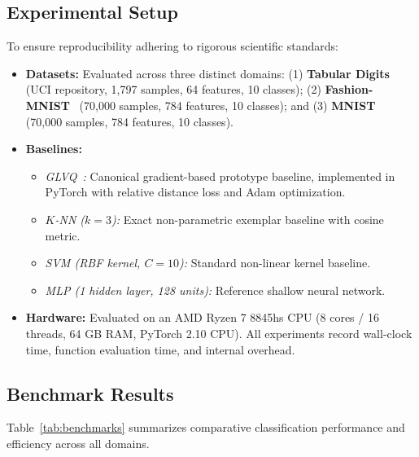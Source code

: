 \documentclass[11pt,a4paper]{article}
\begin{document}
\subsection{Experimental Setup}
To ensure reproducibility adhering to rigorous scientific standards:
\begin{itemize}
    \item \textbf{Datasets:} Evaluated across three distinct domains: (1) \textbf{Tabular Digits} (UCI repository, 1,797 samples, 64 features, 10 classes); (2) \textbf{Fashion-MNIST}~\citep{xiao2017fashion} (70,000 samples, 784 features, 10 classes); and (3) \textbf{MNIST}~\citep{lecun1998gradient} (70,000 samples, 784 features, 10 classes).
    \item \textbf{Baselines:} 
    \begin{itemize}
        \item \textit{GLVQ~\citep{sato1996generalized}:} Canonical gradient-based prototype baseline, implemented in PyTorch with relative distance loss and Adam optimization.
        \item \textit{$K$-NN ($k=3$):} Exact non-parametric exemplar baseline with cosine metric.
        \item \textit{SVM (RBF kernel, $C=10$):} Standard non-linear kernel baseline.
        \item \textit{MLP (1 hidden layer, 128 units):} Reference shallow neural network.
    \end{itemize}
    \item \textbf{Hardware:} Evaluated on an AMD Ryzen 7 8845hs CPU (8 cores / 16 threads, 64 GB RAM, PyTorch 2.10 CPU). All experiments record wall-clock time, function evaluation time, and internal overhead.
\end{itemize}

\subsection{Benchmark Results}

Table~\ref{tab:benchmarks} summarizes comparative classification performance and efficiency across all domains.
\end{document}

